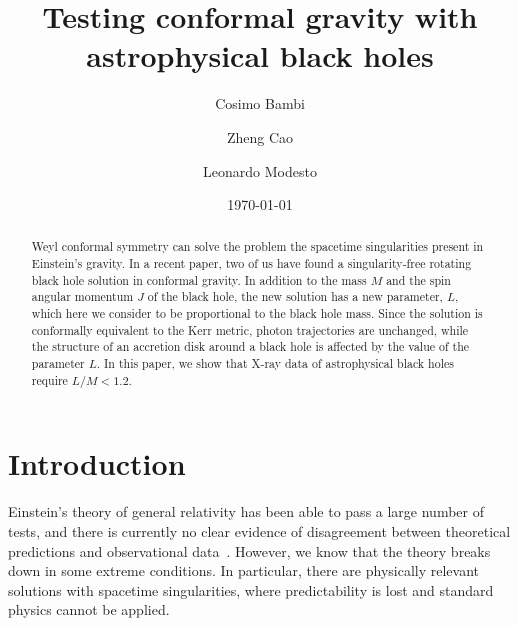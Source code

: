 \documentclass[aps, prd, amsmath, floats, floatfix, twocolumn, nofootinbib, superscriptaddress, showpacs]{revtex4-1}
\begin{document}
\title{Testing conformal gravity with astrophysical black holes}



\author{Cosimo Bambi}

\author{Zheng Cao}

\author{Leonardo Modesto}



\date{\today}

\begin{abstract}
Weyl conformal symmetry can solve the problem the spacetime singularities present in Einstein's gravity. In a recent paper, two of us have found a singularity-free rotating black hole solution in conformal gravity. In addition to the mass $M$ and the spin angular momentum $J$ of the black hole, the new solution has a new parameter, $L$, which here we consider to be proportional to the black hole mass. Since the solution is conformally equivalent to the Kerr metric, photon trajectories are unchanged, while the structure of an accretion disk around a black hole is affected by the value of the parameter $L$. In this paper, we show that X-ray data of astrophysical black holes require $L/M < 1.2$. 
\end{abstract}



\maketitle






\section{Introduction}

Einstein's theory of general relativity has been able to pass a large number of tests, and there is currently no clear evidence of disagreement between theoretical predictions and observational data~\cite{will}. However, we know that the theory breaks down in some extreme conditions. In particular, there are physically relevant solutions with spacetime singularities, where predictability is lost and standard physics cannot be applied.
\end{document}

